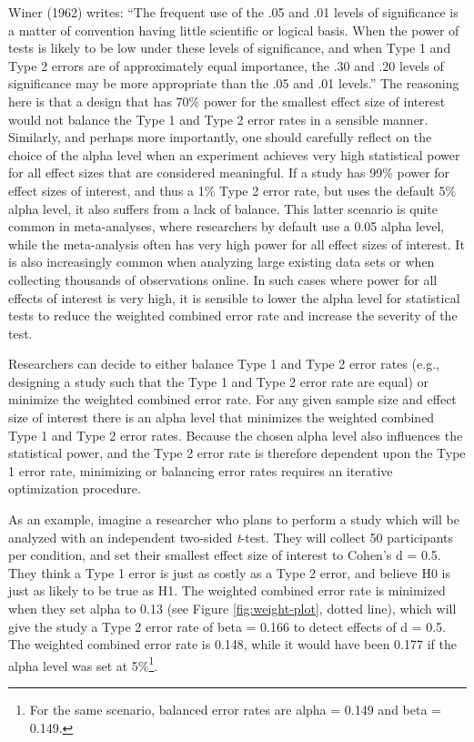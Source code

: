 \documentclass[
  english,
  ,man, a4paper,floatsintext]{apa6}
\begin{document}
Winer (1962) writes: ``The frequent use of the .05 and .01 levels of significance is a matter of convention having little scientific or logical basis. When the power of tests is likely to be low under these levels of significance, and when Type 1 and Type 2 errors are of approximately equal importance, the .30 and .20 levels of significance may be more appropriate than the .05 and .01 levels.'' The reasoning here is that a design that has 70\% power for the smallest effect size of interest would not balance the Type 1 and Type 2 error rates in a sensible manner. Similarly, and perhaps more importantly, one should carefully reflect on the choice of the alpha level when an experiment achieves very high statistical power for all effect sizes that are considered meaningful. If a study has 99\% power for effect sizes of interest, and thus a 1\% Type 2 error rate, but uses the default 5\% alpha level, it also suffers from a lack of balance. This latter scenario is quite common in meta-analyses, where researchers by default use a 0.05 alpha level, while the meta-analysis often has very high power for all effect sizes of interest. It is also increasingly common when analyzing large existing data sets or when collecting thousands of observations online. In such cases where power for all effects of interest is very high, it is sensible to lower the alpha level for statistical tests to reduce the weighted combined error rate and increase the severity of the test.

Researchers can decide to either balance Type 1 and Type 2 error rates (e.g., designing a study such that the Type 1 and Type 2 error rate are equal) or minimize the weighted combined error rate. For any given sample size and effect size of interest there is an alpha level that minimizes the weighted combined Type 1 and Type 2 error rates. Because the chosen alpha level also influences the statistical power, and the Type 2 error rate is therefore dependent upon the Type 1 error rate, minimizing or balancing error rates requires an iterative optimization procedure.

As an example, imagine a researcher who plans to perform a study which will be analyzed with an independent two-sided \emph{t}-test. They will collect 50 participants per condition, and set their smallest effect size of interest to Cohen's d = 0.5. They think a Type 1 error is just as costly as a Type 2 error, and believe H0 is just as likely to be true as H1. The weighted combined error rate is minimized when they set alpha to 0.13 (see Figure \ref{fig:weight-plot}, dotted line), which will give the study a Type 2 error rate of beta = 0.166 to detect effects of d = 0.5. The weighted combined error rate is 0.148, while it would have been 0.177 if the alpha level was set at 5\%\footnote{For the same scenario, balanced error rates are alpha = 0.149 and beta = 0.149.}.
\end{document}
